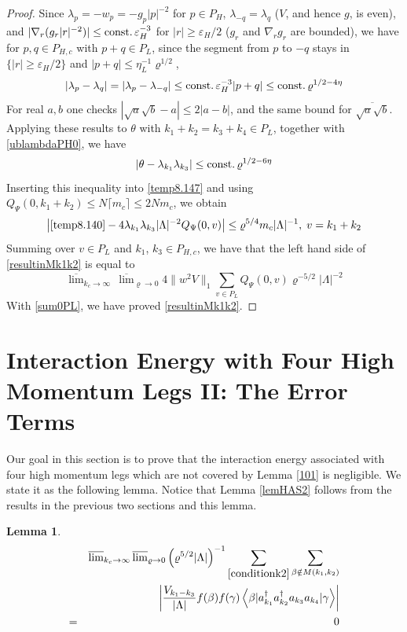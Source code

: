 \documentclass[11pt]{article}
\numberwithin{equation}{section}
\newcommand{\beq}{\begin{equation}}
\newcommand{\eeq}{\end{equation}}
\newcommand{\beqa}{\begin{eqnarray}}
\newcommand{\eeqa}{\end{eqnarray}}
\newcommand\eps{\varepsilon}
\newcommand\const{{\rm const.\, }}
\newcommand\be{\beta}
\renewcommand\rho\varrho
\newtheorem{lem}{Lemma}[section]
\theoremstyle{definition}
\begin{document}
\begin{proof}
Since $\lambda_p=-w_p=-g_p|p|^{-2}$ for $p\in P_H$, $\lambda_{-q}=\lambda_q$ ($V$, and hence $g$, is even), and $|\nabla_r(g_r|r|^{-2})|\leq \const\eps_H^{-3}$ for $|r|\geq\eps_H/2$ ($g_r$ and $\nabla_rg_r$ are bounded), we have for $p, q\in P_{H,c}$ with $p+q\in P_L$, since the segment from $p$ to $-q$ stays in $\{|r|\geq \eps_H/2\}$ and $|p+q|\leq\eta_L^{-1}\rho^{1/2}$,
\beq
\left|\lambda_{p}-\lambda_{q}\right|=\left|\lambda_{p}-\lambda_{-q}\right|\leq \const\eps_H^{-3}|p+q|\leq \const\rho^{1/2-4\eta}
\eeq
For real $a,b$ one checks $|\sqrt a\sqrt b-a|\leq 2|a-b|$, and the same bound for $\overline{\sqrt a\sqrt b}$. Applying these results 
to  $\theta$ with  $k_1+k_2=k_3+k_4\in P_L$, together with \eqref{ublambdaPH0},  we have
\beq
\left|\theta-\lambda_{k_1}\lambda_{k_3}\right|\leq \const\rho^{1/2-6\eta}
\eeq
Inserting this inequality into \eqref{temp8.147} and using  $Q_\Psi(0,k_1+k_2)\leq N\lceil m_c\rceil\leq 2Nm_c$, we obtain 
\beq\label{temp8.150}
\left|\eqref{temp8.140}-4\lambda_{k_1}\lambda_{k_3}|\Lambda|^{-2}Q_\Psi(0,v)\right|\leq \rho^{5/4}m_c|\Lambda|^{-1}, \; v=k_1+k_2
\eeq
Summing over $v\in P_L$ and $k_1$, $k_3\in P_{H,c}$, 
we have that the left hand side of \eqref{resultinMk1k2} is equal to 
\beq
\overline\lim_{k_c\to \infty}\,\overline\lim_{\rho\to0 }4\|w^2V\|_1 \sum_{v\in P_L}Q_\Psi(0,v) \rho^{-5/2} |\Lambda|^{-2}
\eeq
With \eqref{sum0PL}, we have proved \eqref{resultinMk1k2}. 
\end{proof}





\section{Interaction  Energy with Four High Momentum Legs II:  The Error Terms} 

Our goal in this section is to prove that the interaction energy associated  with four high momentum legs 
which are not covered by Lemma \ref{101}  is negligible. We state it as the following lemma.  Notice that 
Lemma \ref{lemHAS2} follows from the results in the previous two sections and this lemma. 

\begin{lem}\label{113}
\beqa\nonumber
&&\overline\lim_{k_c\to\infty}\,\overline\lim_{\rho\to0}\left(\rho^{5/2}|\Lambda|\right)^{-1}\sum_{\eqref{conditionk2}}\sum_{\be\notin M(k_1,k_2)}\\\nonumber
&&\qquad\qquad\left|\frac{V_{k_1-k_3}}{|\Lambda|}f(\be)f(\gamma)\left\langle\be| a^\dagger_{k_1}a^\dagger_{k_2}a_{k_3}a_{k_4}|\gamma\right\rangle\right|\\\label{totalresultinMk1k2}=&&0
\eeqa
\end{lem}
\end{document}
